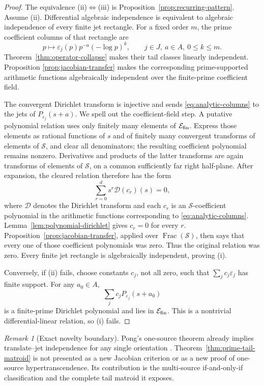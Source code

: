 \documentclass[11pt]{article}
\theoremstyle{definition}
\theoremstyle{remark}
\newtheorem{remark}[theorem]{Remark}
\newcommand{\cE}{\mathcal E}
\newcommand{\Frac}{\operatorname{Frac}}
\begin{document}
\begin{proof}
The equivalence (ii)\(\Leftrightarrow\)(iii) is
Proposition~\ref{prop:recurring-pattern}.  Assume (ii).  Differential algebraic independence is
equivalent to algebraic independence of every finite jet rectangle.  For a fixed order \(m\),
the prime coefficient columns of that rectangle are
\begin{equation}\label{eq:analytic-columns}
  p\longmapsto
  \varepsilon_j(p)p^{-a}(-\log p)^k,
  \qquad j\in J,\ a\in A,\ 0\leq k\leq m.
\end{equation}
Theorem~\ref{thm:operator-collapse} makes their tail classes linearly independent.  Proposition
\ref{prop:jacobian-transfer} makes the corresponding prime-supported arithmetic functions
algebraically independent over the finite-prime coefficient field.

The convergent Dirichlet transform is injective and sends \eqref{eq:analytic-columns} to the jets
of \(P_{\varepsilon_j}(s+a)\).  We spell out the coefficient-field step.  A putative polynomial
relation uses only finitely many elements of \(\cE_{\rm fin}\).  Express those elements as rational
functions of \(s\) and of finitely many convergent transforms of elements of \(\mathscr S\), and
clear all denominators; the resulting coefficient polynomial remains nonzero.  Derivatives and
products of the latter transforms are again transforms of
elements of \(\mathscr S\), on a common sufficiently far right half-plane.  After expansion, the
cleared relation therefore has the form
\[
  \sum_{r=0}^{d}s^r\mathcal D(c_r)(s)=0,
\]
where \(\mathcal D\) denotes the Dirichlet transform and each \(c_r\) is an
\(\mathscr S\)-coefficient polynomial in the arithmetic functions corresponding to
\eqref{eq:analytic-columns}.  Lemma~\ref{lem:polynomial-dirichlet} gives \(c_r=0\) for every
\(r\).  Proposition~\ref{prop:jacobian-transfer}, applied over \(\Frac(\mathscr S)\), then says
that every one of those coefficient polynomials was zero.  Thus the original relation was zero.
Every finite jet rectangle is algebraically independent, proving (i).

Conversely, if (ii) fails, choose constants \(c_j\), not all zero, such that
\(\sum_jc_j\varepsilon_j\) has finite support.  For any \(a_0\in A\),
\[
  \sum_jc_jP_{\varepsilon_j}(s+a_0)
\]
is a finite-prime Dirichlet polynomial and lies in \(\cE_{\rm fin}\).  This is a nontrivial
differential-linear relation, so (i) fails.
\end{proof}

\begin{remark}[Exact novelty boundary]\label{rem:novelty-boundary}
Pong's one-source theorem already implies translate--jet independence for any single orientation
\cite[Theorem~5.9]{Pong2016}.  Theorem~\ref{thm:prime-tail-matroid} is not presented as a new
Jacobian criterion or as a new proof of one-source hypertranscendence.  Its contribution is the
multi-source if-and-only-if classification and the complete tail matroid it exposes.
\end{remark}
\end{document}
